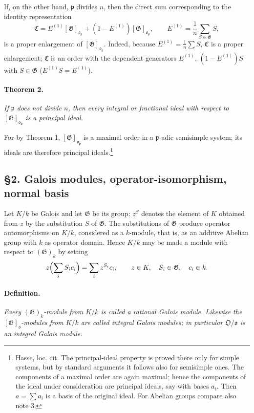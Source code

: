 \documentclass[11pt]{article}
\providecommand{\frakO}{\mathfrak O}
\providecommand{\frako}{\mathfrak o}
\providecommand{\frakp}{\mathfrak p}
\providecommand{\Gg}{\mathfrak G}
\begin{document}
If, on the other hand, \(\frakp\) divides \(n\), then the direct sum corresponding to the identity representation
\[
        \mathfrak C=E^{(1)}[\Gg]_{\frako_\frakp}+(1-E^{(1)})[\Gg]_{\frako_\frakp},
        \qquad
        E^{(1)}=\frac1n\sum_{S\in\Gg} S,
\]
is a proper enlargement of \([\Gg]_{\frako_\frakp}\). Indeed, because \(E^{(1)}=\frac1n\sum S\), \(\mathfrak C\) is a proper enlargement; \(\mathfrak C\) is an order with the dependent generators \(E^{(1)}\), \((1-E^{(1)})S\) with \(S\in\Gg\) (\(E^{(1)}S=E^{(1)}\)).

\paragraph{Theorem 2.}
\emph{If \(\frakp\) does not divide \(n\), then every integral or fractional ideal with respect to \([\Gg]_{\frako_\frakp}\) is a principal ideal.}

For by Theorem 1, \([\Gg]_{\frako_\frakp}\) is a maximal order in a \(\frakp\)-adic semisimple system; its ideals are therefore principal ideals.\footnote{Hasse, loc. cit. The principal-ideal property is proved there only for simple systems, but by standard arguments it follows also for semisimple ones. The components of a maximal order are again maximal; hence the components of the ideal under consideration are principal ideals, say with bases \(a_i\). Then \(a=\sum a_i\) is a basis of the original ideal. For Abelian groups compare also note 3.}

\subsection*{§2. Galois modules, operator-isomorphism, normal basis}

Let \(K/k\) be Galois and let \(\Gg\) be its group; \(z^S\) denotes the element of \(K\) obtained from \(z\) by the substitution \(S\) of \(\Gg\). The substitutions of \(\Gg\) produce operator automorphisms on \(K/k\), considered as a \(k\)-module, that is, as an additive Abelian group with \(k\) as operator domain. Hence \(K/k\) may be made a module with respect to \((\Gg)_k\) by setting
\[
        z\Bigl(\sum_i S_i c_i\Bigr)=\sum_i z^{S_i}c_i,
        \qquad z\in K,
        \quad S_i\in\Gg,
        \quad c_i\in k.
\]

\paragraph{Definition.}
\emph{Every \((\Gg)_k\)-module from \(K/k\) is called a rational Galois module. Likewise the \([\Gg]_\frako\)-modules from \(K/k\) are called integral Galois modules; in particular \(\frakO/\frako\) is an integral Galois module.}
\end{document}
